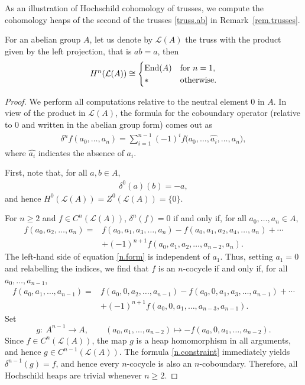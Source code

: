 \documentclass[10pt,a4paper]{amsart}
\numberwithin{equation}{section}
\begin{document}
As an illustration of Hochschild cohomology of trusses, we compute the cohomology heaps of the second of the trusses \eqref{truss.ab} in Remark~\ref{rem.trusses}.

\begin{Example}\label{ex.HH.ab}
 For an abelian group $A$, let us denote by $\mathcal{L}(A)$ the truss with the product given by the left projection, that is $ab =a$, then
 \begin{align*}%
 H^n(\mathcal{L}(A)) \cong \begin{cases}
 \operatorname{End}(A) & \mbox{for}\ n=1, \cr
 \ast & \mbox{otherwise}.
 \end{cases}
 \end{align*}
\end{Example}
\begin{proof}
 We perform all computations relative to the neutral element $0$ in $A$. In view of the product in $\mathcal{L}(A)$, the formula for the coboundary operator (relative to $0$ and written in the abelian group form) comes out as
 \begin{gather}\label{dnf}
 \delta^n f(a_0,\dots,a_n) = \sum^{n-1}_{i=1}(-1)^i f \big(a_0,\dots ,\widehat{a_i},\dots,a_n\big),
\end{gather}
where $\widehat{a_i}$ indicates the absence of $a_i$.

First, note that, for all $a,b\in A$,
 \begin{gather}\label{0.cob}
 \delta^0(a)(b) = -a,
 \end{gather}
 and hence $H^0(\mathcal{L}(A))= Z^0(\mathcal{L}(A)) =\{0\}$.

 For $n\geq 2$ and $f\in C^n(\mathcal{L}(A))$, $\delta^n (f) = 0$ if and only if, for all $a_0,\dots, a_n\in A$,
 \begin{align}
 f(a_0,a_2,\dots , a_n)={}& f(a_0,a_1,a_3,\dots, a_n) - f(a_0,a_1,a_2,a_4,\dots, a_n)+\cdots \nonumber\\
 &+ (-1)^{n+1}f(a_0,a_1,a_2,\dots, a_{n-2}, a_n).\label{n.form}
 \end{align}
 The left-hand side of equation \eqref{n.form} is independent of $a_1$. Thus, setting $a_1=0$ and relabelling the indices, we find that $f$ is an $n$-cocycle if and only if, for all $a_0,\dots, a_{n-1}$,
 \begin{align}
 f(a_0,a_1,\dots , a_{n-1}) ={}& f(a_0,0, a_2,\dots, a_{n-1}) - f(a_0,0,a_1,a_3,\dots, a_{n-1})+\cdots\nonumber\\
 & + (-1)^{n+1}f(a_0,0,a_1,\dots, a_{n-3}, a_{n-1}).\label{n.constraint}
 \end{align}
 Set
 \[
 g\colon\ A^{n-1} \to A, \qquad (a_0,a_1,\dots , a_{n-2})\mapsto -f(a_0,0,a_1,\dots , a_{n-2}).
 \]
 Since $f\in C^n(\mathcal{L}(A))$, the map $g$ is a heap homomorphism in all arguments, and hence $g\in C^{n-1}(\mathcal{L}(A))$. The formula \eqref{n.constraint} immediately yields $\delta^{n-1}(g) =f$, and hence every $n$-cocycle is also an $n$-coboundary. Therefore, all Hochschild heaps are trivial whenever $n\geq 2$.


\end{proof}
\end{document}
